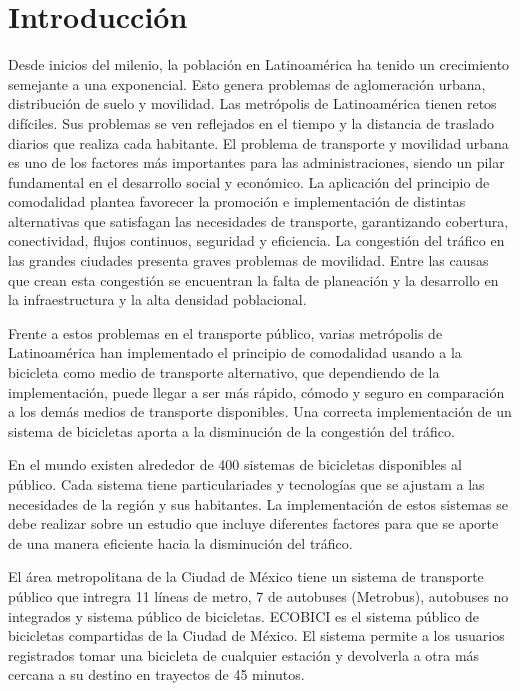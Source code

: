 \section{Introducción}

Desde inicios del milenio, la población en Latinoamérica ha tenido un crecimiento semejante a una exponencial\cite{CEPAL_2015}. Esto genera problemas de aglomeración urbana, distribución de suelo y movilidad. Las metrópolis de Latinoamérica tienen retos difíciles. Sus problemas se ven reflejados en el tiempo y la distancia de traslado diarios que realiza cada habitante\cite{hall_1978}. El problema de transporte y movilidad urbana es uno de los factores más importantes para las administraciones, siendo un pilar fundamental en el desarrollo social y económico. La aplicación del principio de comodalidad plantea favorecer la promoción e implementación de distintas alternativas que satisfagan las necesidades de transporte, garantizando cobertura, conectividad, flujos continuos, seguridad y eficiencia\cite{pastori_2018}. La congestión del tráfico en las grandes ciudades presenta graves problemas de movilidad. Entre las causas que crean esta congestión se encuentran la falta de planeación y la desarrollo en la infraestructura y la alta densidad poblacional.

Frente a estos problemas en el transporte público, varias metrópolis de Latinoamérica han implementado el principio de comodalidad usando a la bicicleta como medio de transporte alternativo, que dependiendo de la implementación, puede llegar a ser más rápido, cómodo y seguro en comparación a los demás medios de transporte disponibles.
Una correcta implementación de un sistema de bicicletas aporta a la disminución de la congestión del tráfico.

En el mundo existen alrededor de 400 sistemas de bicicletas disponibles al público. Cada sistema tiene particulariades y tecnologías que se ajustam a las necesidades de la región y sus habitantes. La implementación de estos sistemas se debe realizar sobre un estudio que incluye diferentes factores para que se aporte de una manera eficiente hacia la disminución del tráfico.

El área metropolitana de la Ciudad de México tiene un sistema de transporte público que intregra 11 líneas de metro, 7 de autobuses (Metrobus), autobuses no integrados y sistema público de bicicletas. ECOBICI es el sistema público de bicicletas compartidas de la Ciudad de México. El sistema permite a los usuarios registrados tomar una bicicleta de cualquier estación y devolverla a otra más cercana a su destino en trayectos de 45 minutos.

